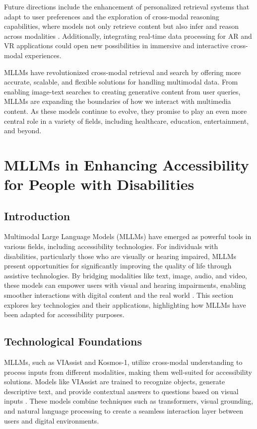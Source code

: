 Future directions include the enhancement of personalized retrieval systems that adapt to user preferences and the exploration of cross-modal reasoning capabilities, where models not only retrieve content but also infer and reason across modalities \cite{vs2024yin,vs2024palmagomez}. Additionally, integrating real-time data processing for AR and VR applications could open new possibilities in immersive and interactive cross-modal experiences.

MLLMs have revolutionized cross-modal retrieval and search by offering more accurate, scalable, and flexible solutions for handling multimodal data. From enabling image-text searches to creating generative content from user queries, MLLMs are expanding the boundaries of how we interact with multimedia content. As these models continue to evolve, they promise to play an even more central role in a variety of fields, including healthcare, education, entertainment, and beyond.

\section{MLLMs in Enhancing Accessibility for People with Disabilities}

\subsection{Introduction}
Multimodal Large Language Models (MLLMs) have emerged as powerful tools in various fields, including accessibility technologies. For individuals with disabilities, particularly those who are visually or hearing impaired, MLLMs present opportunities for significantly improving the quality of life through assistive technologies. By bridging modalities like text, image, audio, and video, these models can empower users with visual and hearing impairments, enabling smoother interactions with digital content and the real world \cite{vs2024yang,huang2023language}. This section explores key technologies and their applications, highlighting how MLLMs have been adapted for accessibility purposes.

\subsection{Technological Foundations}
MLLMs, such as VIAssist and Kosmos-1, utilize cross-modal understanding to process inputs from different modalities, making them well-suited for accessibility solutions. Models like VIAssist are trained to recognize objects, generate descriptive text, and provide contextual answers to questions based on visual inputs \cite{yang2024viassist}. These models combine techniques such as transformers, visual grounding, and natural language processing to create a seamless interaction layer between users and digital environments.

